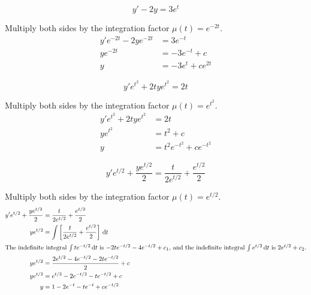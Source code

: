 \begin{ex}
  \[y' -2y =3e^t\]
  \begin{sol}
    Multiply both sides by the integration factor $\mu(t) = e^{-2t}$.
    \begin{align*}
      y'e^{-2t} -2ye^{-2t} &= 3e^{-t} \\
      ye^{-2t} &= -3 e^{-t} +c \\
      y &= -3 e^t +ce^{2t}
    \end{align*}
  \end{sol}
\end{ex}
\begin{ex}
  \[ y' e^{t^2}+2tye^{t^2} = 2t \]
   \begin{sol}
    Multiply both sides by the integration factor $\mu(t) = e^{t^2}$.
    \begin{align*}
      y'e^{t^2}+2tye^{t^2} &= 2t \\
      y e^{t^2} &= t^2 +c \\
      y &= t^2 e^{-t^2}+ce^{-t^2}
    \end{align*}
  \end{sol}
\end{ex}
\begin{ex}
  \[y'e^{t/2}+\frac{ye^{t/2}}{2} = \frac{t}{2e^{t/2}} + \frac{e^{t/2}}{2} \]
  \begin{sol}
   Multiply both sides by the integration factor $\mu(t) = e^{t/2}$.
   \begin{align*}
     y'e^{t/2}+\frac{ye^{t/2}}{2} &= \frac{t}{2e^{t/2}} + \frac{e^{t/2}}{2} \\
     y e^{t/2} &= \int \left[ \frac{t}{2e^{t/2}} + \frac{e^{t/2}}{2} \right] \,\mathrm{d} t \\
     \intertext{The indefinite integral $\int t e^{-t/2} \,\mathrm{d} t$ is $-2t e^{-t/2}-4e^{-t/2}+c_1$, and the indefinite integral $\int e^{t/2} \,\mathrm{d} t$ is $2e^{t/2}+c_2$.}
     ye^{t/2} &= \frac{2e^{t/2}-4e^{-t/2}-2te^{-t/2}}{2}+c \\
     ye^{t/2} &= e^{t/2} -2 e^{-t/2}-t e^{-t/2}+c \\
     y &= 1 -2e^{-t} -t e^{-t} + c e^{-t/2}
   \end{align*}
  \end{sol}
\end{ex}
